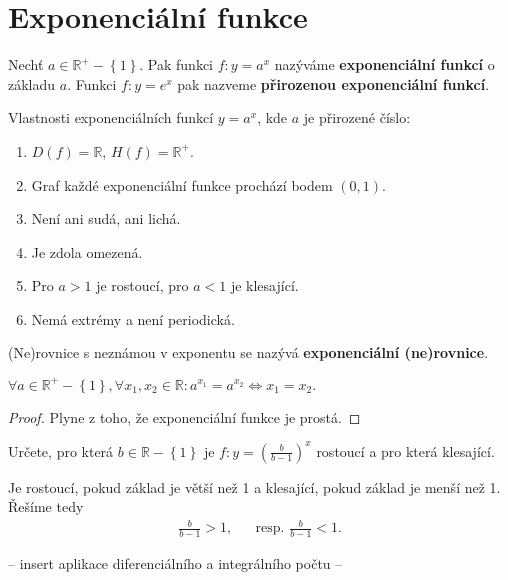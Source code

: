 \section{Exponenciální funkce}
\begin{definition}
    Nechť $a\in \mathbb R^+ - \left \{ 1 \right \}. $ Pak funkci $f:y=a^x$
    nazýváme \textbf{exponenciální funkcí} o základu $a$. Funkci $f:y=e^x$ pak
    nazveme \textbf{přirozenou exponenciální funkcí}.
\end{definition}

\begin{veta}
    Vlastnosti exponenciálních funkcí $y= a^x$, kde $a$ je přirozené číslo:
    \begin{enumerate}[$i.$]
        \item $D(f)= \mathbb R$, $H(f)= \mathbb R^+$.
       	\item Graf každé exponenciální funkce prochází bodem $(0,1).$
        \item Není ani sudá, ani lichá.
        \item Je zdola omezená.
        \item Pro $a >1$ je rostoucí, pro $a<1$ je klesající.
        \item Nemá extrémy a není periodická.
    \end{enumerate}
\end{veta}

\begin{definition}
    (Ne)rovnice s neznámou v exponentu se nazývá \textbf{exponenciální (ne)rovnice}.
\end{definition}

\begin{veta}
    $\forall a \in \mathbb R^+ - \left \{ 1 \right \}, \forall x_1, x_2
    \in \mathbb R: a^{x_1}=a^{x_2}\iff x_1=x_2.$
\end{veta}

\begin{proof}
    Plyne z toho, že exponenciální funkce je prostá.
\end{proof}

\begin{priklad}
Určete, pro která $b\in \mathbb R-\left \{ 1 \right \} $ je $f:y=\left ( \frac{b}{b-1} \right )^x $
rostoucí a pro která klesající.
\end{priklad}

\begin{reseni}
Je rostoucí, pokud základ je větší než 1 a klesající, pokud základ je menší než 1.
Řešíme tedy
\begin{align*}
\frac{b}{b-1}>1, & & \textrm{resp. } \frac{b}{b-1}<1.
\end{align*}
\end{reseni}

-- insert aplikace diferenciálního a integrálního počtu --
